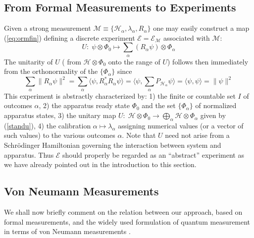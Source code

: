 \documentclass[12pt]{article}
\newcommand{\eq}[1]{(\ref{#1})}
\newcommand{\Sc}{Schr\"{o}dinger}
\renewcommand{\a}{\alpha}
\newcommand{\la}{\lambda_{\a}}
\newcommand{\ot}{\otimes}
\newcommand{\biga}{\bigoplus_{\a}}
\newcommand{\Phia}{\Phi_{\a}}
\newcommand{\Ha}{{\H}_{\a}}
\renewcommand{\H}{\mbox{$\mathcal{H}$}}
\newcommand{\Pa}{ P_{ {\mathcal{H}_{\a} } } }
\newcommand{\Aa}{R_{\a}}
\newcommand{\E}{\mbox{$\mathscr{E}$}}
\newcommand{\M}{\mbox{$\mathcal{M}$}}
\begin{document}
\subsection{From Formal Measurements to Experiments}\label{subsec.exp}

Given a strong measurement $\M\equiv \{\Ha, \la, \Aa \}$ one may
easily construct a map \eq{eq:ormfin} defining a discrete experiment
$\E{}=\E_{\mathcal{M}}$ associated with $\M$:
\begin{equation}
U: \;\psi \ot \Phi_0  \mapsto
\sum_{\a} (\Aa\psi) \ot \Phia
\label{standu}
\end{equation}
The unitarity of $U$ ( {}from $ \H\ot\Phi_0 $ onto the range of $U$)
follows then immediately {}from the orthonormality of the $\{\Phia\}$
since
\begin{equation}
\sum_{\a} \|\Aa\psi\|^{2} = \sum_{\a} \langle \psi, \Aa^{\ast}\Aa
\psi \rangle
= \langle \psi, \sum_{\a} \Pa \psi \rangle = \langle
\psi,\psi\rangle = \|\psi\|^2
\label{eq:unide}
\end{equation}
This experiment is abstractly characterized by: 1) the finite or
countable set $I$ of outcomes $\a$, 2) the apparatus ready state
$\Phi_{0}$ and the set $\{\Phia\}$ of normalized apparatus states, 3)
the unitary map $U : \;{\H}\ot\Phi_0 \to \biga {\H} \ot\Phia$ given by
(\ref{standu}), 4) the calibration $\a \mapsto \la$ assigning
numerical values (or a vector of such values) to the various outcomes
$\a$.  Note that $U$ need not arise {}from a \Sc{} Hamiltonian
governing the interaction between system and apparatus. Thus \E{}
should properly be regarded as an ``abstract'' experiment as we have
already pointed out in the introduction to this section.

\subsection{Von Neumann Measurements}
\label{sec:vNM}

We shall now briefly comment on the relation between our approach,
based on formal measurements, and the widely used formulation of
quantum measurement in terms of von Neumann measurements \cite{vNe55}.
\end{document}
